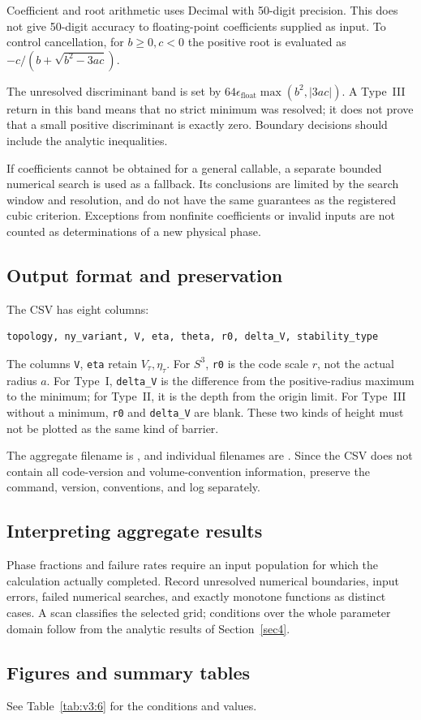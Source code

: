 Coefficient and root arithmetic uses Decimal with 50-digit precision.
This does not give 50-digit accuracy to floating-point coefficients
supplied as input.
To control cancellation, for $b\ge0,c<0$ the positive root is evaluated
as $-c/(b+\sqrt{b^2-3ac})$.

The unresolved discriminant band is set by
$64\epsilon_{\mathrm{float}}\max(b^2,|3ac|)$.
A Type~III return in this band means that no strict minimum was resolved;
it does not prove that a small positive discriminant is exactly zero.
Boundary decisions should include the analytic inequalities.

If coefficients cannot be obtained for a general callable, a separate
bounded numerical search is used as a fallback.
Its conclusions are limited by the search window and resolution,
and do not have the same guarantees as the registered cubic criterion.
Exceptions from nonfinite coefficients or invalid inputs are not
counted as determinations of a new physical phase.

\subsection{Output format and preservation}
The CSV has eight columns:
\begin{lstlisting}[language={}]
topology, ny_variant, V, eta, theta, r0, delta_V, stability_type
\end{lstlisting}
The columns \texttt{V}, \texttt{eta} retain $V_\tau,\eta_\tau$.
For $S^3$, \texttt{r0} is the code scale $r$, not the actual radius $a$.
For Type~I, \texttt{delta\_V} is the difference from the positive-radius
maximum to the minimum; for Type~II, it is the depth from the origin
limit. For Type~III without a minimum, \texttt{r0} and \texttt{delta\_V}
are blank. These two kinds of height must not be plotted as the same
kind of barrier.

The aggregate filename is
, and individual filenames are
.
Since the CSV does not contain all code-version and volume-convention
information, preserve the command, version, conventions, and log separately.

\subsection{Interpreting aggregate results}
Phase fractions and failure rates require an input population for which
the calculation actually completed.
Record unresolved numerical boundaries, input errors, failed numerical
searches, and exactly monotone functions as distinct cases.
A scan classifies the selected grid; conditions over the whole parameter
domain follow from the analytic results of Section~\ref{sec4}.

\subsection{Figures and summary tables}
See Table~\ref{tab:v3:6} for the conditions and values.


\FloatBarrier
